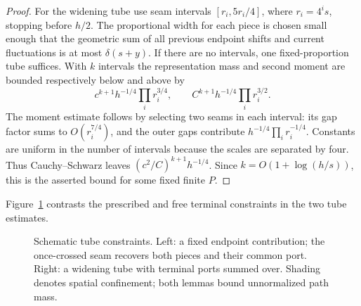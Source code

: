 \begin{proof}
For the widening tube use seam intervals
\([r_i,5r_i/4]\), where \(r_i=4^is\), stopping before \(h/2\).
The proportional width for each piece is chosen small enough that the
geometric sum of all previous endpoint shifts and current fluctuations
is at most \(\delta(s+y)\). If there are no intervals, one
fixed-proportion tube suffices. With \(k\) intervals the representation
mass and second moment are bounded respectively below and above by
\[
 c^{k+1}h^{-1/4}\prod_i r_i^{3/4},\qquad
 C^{k+1}h^{-1/4}\prod_i r_i^{3/2}.
\]
The moment estimate follows by selecting two seams in each interval:
its gap factor sums to \(O(r_i^{7/4})\), and the outer gaps contribute
\(h^{-1/4}\prod_i r_i^{-1/4}\). Constants are uniform in the number
of intervals because the scales are separated by four. Thus
Cauchy--Schwarz leaves \((c^2/C)^{k+1}h^{-1/4}\).
Since \(k=O(1+\log(h/s))\), this is the asserted bound for some fixed
finite \(P\).
\end{proof}

Figure~\ref{fig:08-tubes} contrasts the prescribed and free terminal
constraints in the two tube estimates.

\begin{figure}[tb]
\centering
{}
\caption{Schematic tube constraints. Left: a fixed endpoint contribution;
the once-crossed seam recovers both pieces and their common port. Right:
a widening tube with terminal ports summed over. Shading denotes spatial
confinement; both lemmas bound unnormalized path mass.}
\label{fig:08-tubes}
\end{figure}

